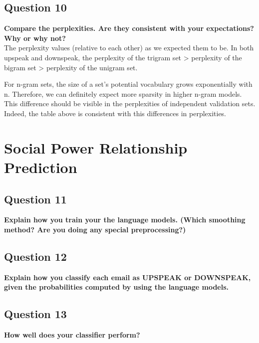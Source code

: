 \documentclass{article} %
\begin{document}
\subsection*{Question 10}

\textbf{Compare the perplexities. Are they consistent with your expectations? Why or why not?}
\\

The perplexity values (relative to each other) as we expected them to be. In both upspeak and downspeak, the perplexity of the trigram set > perplexity of the bigram set > perplexity of the unigram set.

For n-gram sets, the size of a set's potential vocabulary grows exponentially with n. Therefore, we can definitely expect more sparsity in higher n-gram models. This difference should be visible in the perplexities of independent validation sets. Indeed, the table above is consistent with this differences in perplexities.


\section{Social Power Relationship Prediction}


\subsection*{Question 11}

\textbf{Explain how you train your the language models. (Which smoothing method? Are you doing any special preprocessing?)}
\\



\subsection*{Question 12}

\textbf{Explain how you classify each email as UPSPEAK or DOWNSPEAK, given the probabilities computed by using the language models.}



\subsection*{Question 13}

\textbf{How well does your classifier perform?}
\end{document}
